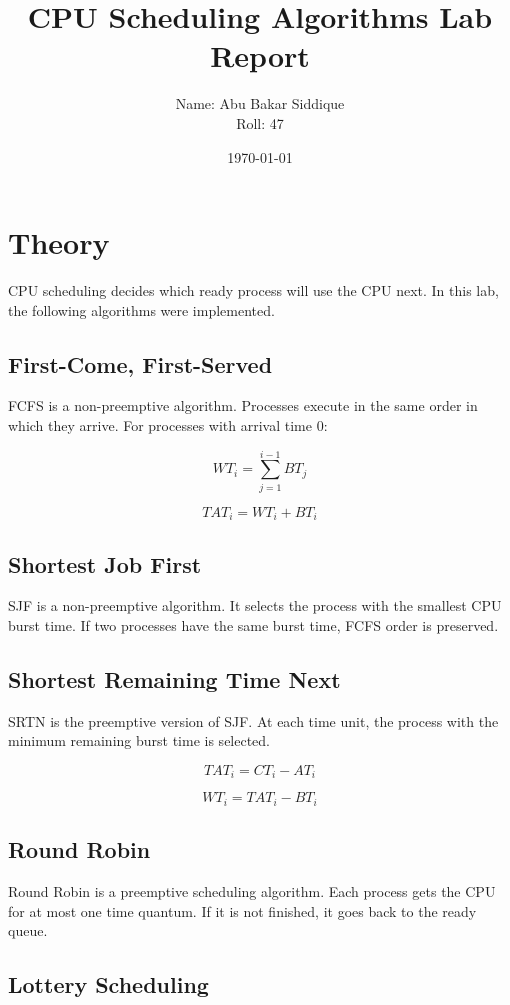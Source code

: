 \documentclass[12pt,a4paper]{article}
\title{CPU Scheduling Algorithms Lab Report}
\author{Name: Abu Bakar Siddique\\Roll: 47}
\date{\today}
\begin{document}
\maketitle

\section{Theory}

CPU scheduling decides which ready process will use the CPU next. In this lab, the following algorithms were implemented.

\subsection{First-Come, First-Served}

FCFS is a non-preemptive algorithm. Processes execute in the same order in which they arrive. For processes with arrival time 0:

\[
WT_i = \sum_{j=1}^{i-1} BT_j
\]

\[
TAT_i = WT_i + BT_i
\]

\subsection{Shortest Job First}

SJF is a non-preemptive algorithm. It selects the process with the smallest CPU burst time. If two processes have the same burst time, FCFS order is preserved.

\subsection{Shortest Remaining Time Next}

SRTN is the preemptive version of SJF. At each time unit, the process with the minimum remaining burst time is selected.

\[
TAT_i = CT_i - AT_i
\]

\[
WT_i = TAT_i - BT_i
\]

\subsection{Round Robin}

Round Robin is a preemptive scheduling algorithm. Each process gets the CPU for at most one time quantum. If it is not finished, it goes back to the ready queue.

\subsection{Lottery Scheduling}
\end{document}
